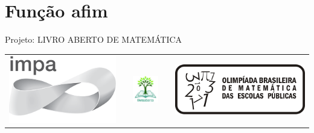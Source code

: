 \renewcommand\chapterillustration{abertura-afim}
\renewcommand\chapterwhat{Funções linear e afim e suas representações algébrica e gráfica, taxa de variação, proporcionalidade direta, funções afins de domínio discreto (Progressões Aritméticas), Aplicações.}
\renewcommand\chapterbecause{O modelo de variação constante é um dos modelos mais presentes em observações científicas e até mesmo em nosso cotidiano. Ele pode ser identificado por exemplo, em relações que modelam a compra/consumo e venda, o esvaziamento de um recipiente por um ralo em função do tempo ou na relação entre distância e tempo do “movimento uniforme” estudado pela Cinemática, entre tantos outros. Um caso particularmente importante é aquele em que há proporcionalidade entre as grandezas envolvidas na modelagem. As ideias desenvolvidas nesse capítulo servem como base para aplicações em diversas áreas.}
\chapter{Função afim}



\mbox{}\thispagestyle{empty}\clearpage

\thispagestyle{empty}

\begin{center}
Projeto: LIVRO ABERTO DE MATEMÁTICA

\noindent \begin{tabular}{lcccr}
\includegraphics[scale=.15]{impa}& \quad\quad& \includegraphics[width=3cm]{logo} & \quad\quad& \includegraphics[scale=.24]{obmep} 
\end{tabular}
\end{center}

